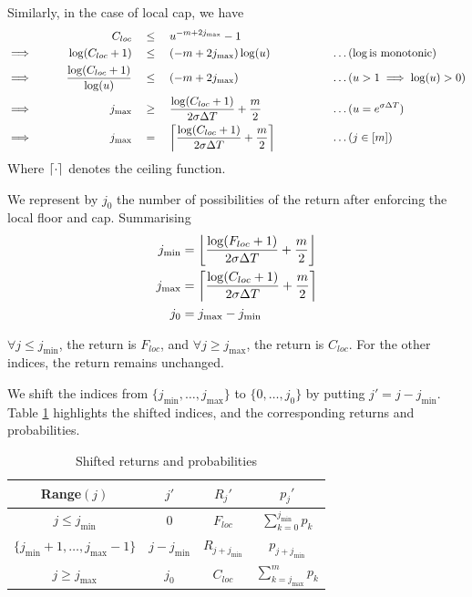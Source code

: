 Similarly, in the case of local cap, we have
\begin{alignat*}{9}
	                 &&  C_{loc}  \quad & \le \quad  u^{ -m + 2 j_{\max} } - 1 && \\
	\implies \qquad  &&  \log(C_{loc} + 1)  \quad & \le \quad  ( -m + 2 j_{\max} ) \log(u)  &&  \qquad \qquad \dots (\log \text{is monotonic}) \\
	\implies \qquad  &&  \frac{\log(C_{loc} + 1)}{\log(u)}  \quad & \le \quad  ( -m + 2 j_{\max} )  &&  \qquad \qquad \dots (u > 1 \implies \log(u) > 0) \\
	\implies \qquad  &&  j_{\max}  \quad & \ge \quad  \frac{ \log(C_{loc} + 1) }{ 2 \sigma \Delta T } + \frac{m}{2}  &&  \qquad \qquad \dots (u = e^{ \sigma \Delta T }) \\
	\implies \qquad  &&  j_{\max}  \quad & = \quad  \left\lceil \frac{ \log(C_{loc} + 1) }{ 2 \sigma \Delta T } + \frac{m}{2} \right\rceil  &&  \qquad \qquad \dots (j \in [m]) \\
\end{alignat*}
Where $ \left\lceil\cdot\right\rceil $ denotes the ceiling function.

We represent by $ j_0 $ the number of possibilities of the return after enforcing the local floor and cap. Summarising
\begin{subequations}
	\label{eq:clq-j-mix-max}
	\begin{align}
		j_{\min} &= \left\lfloor \frac{ \log(F_{loc} + 1) }{ 2 \sigma \Delta T } + \frac{m}{2} \right\rfloor  \\
		j_{\max} &= \left\lceil \frac{ \log(C_{loc} + 1) }{ 2 \sigma \Delta T } + \frac{m}{2} \right\rceil  \\
		j_0 &= j_{\max} - j_{\min}
	\end{align}
\end{subequations}

$ \forall j \le j_{\min} $, the return is $ F_{loc} $, and $ \forall j \ge j_{\max} $, the return is $ C_{loc} $. For the other indices, the return remains unchanged.

We shift the indices from $ \{ j_{\min}, \dots, j_{\max} \} $ to $ \{ 0, \dots, j_0 \} $ by putting $ j' = j - j_{\min} $. Table \ref{tab:clq-shift} highlights the shifted indices, and the corresponding returns and probabilities.
\begin{table}[h]
	\centering
	\caption{Shifted returns and probabilities}
	\label{tab:clq-shift}
	\begin{tabular}{cccc}
		\toprule
		Range$(j)$  &  $ j' $  &  $ R_j' $  &  $ p_j' $  \\
		\midrule
		$ j \le j_{\min} $  &  $ 0 $  &  $ F_{loc} $  &  $ \sum_{k=0}^{j_{\min}} p_k $  \\
		$ \{ j_{\min} + 1, \dots, j_{\max} - 1 \} $  &  $ j - j_{\min} $ &  $ R_{j + j_{\min}} $  &  $ p_{j + j_{\min}} $  \\
		$ j \ge j_{\max} $  &  $ j_0 $  &  $ C_{loc} $  &  $ \sum_{k=j_{\max}}^{m} p_k $  \\
		\bottomrule
	\end{tabular}
\end{table}

